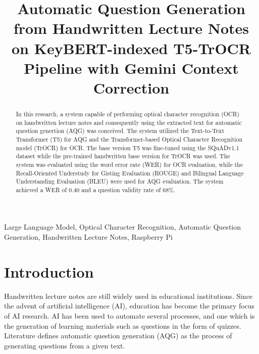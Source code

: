 \documentclass[conference]{IEEEtran}
\begin{document}
\title{Automatic Question Generation from Handwritten Lecture Notes on
KeyBERT-indexed T5-TrOCR Pipeline with Gemini Context Correction}

\author{
}

\maketitle

\begin{abstract}
In this research, a system capable of performing optical character recognition
(OCR) on handwritten lecture notes and consequently using the extracted text for
automatic question genertion (AQG) was conceived. The system utilized the Text-to-Text
Transformer (T5) for AQG and the Transformer-based Optical Character Recognition 
model (TrOCR) for OCR. The base version T5 was fine-tuned
using the SQuADv1.1 dataset while the pre-trained handwritten base version for
TrOCR was used. The system was evaluated using the word error rate (WER) for
OCR evaluation, while the Recall-Oriented Understudy for Gisting Evaluation (ROUGE)
and Bilingual Language Understanding Evaluation (BLEU) were used for AQG evaluation. 
The system achieved a WER of 0.40 and a question validity rate of 68\%.
\end{abstract}

\begin{IEEEkeywords}
Large Language Model, Optical Character Recognition,
Automatic Question Generation, Handwritten Lecture Notes, Raspberry Pi
\end{IEEEkeywords}

\section{Introduction}
Handwritten lecture notes are still widely used in educational institutions.
Since the advent of artificial intelligence (AI), education has become
the primary focus of AI research. AI has been used to automate several processes,
and one which is the generation of learning materials such as questions in the
form of quizzes. Literature defines automatic question generation (AQG) as the
process of generating questions from a given text. 
\end{document}
